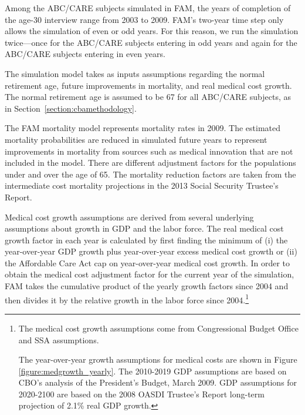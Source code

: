 \noindent Among the ABC/CARE subjects simulated in FAM, the years of completion of the age-30 interview range from 2003 to 2009. FAM's two-year time step only allows the simulation of even or odd years. For this reason, we run the simulation twice---once for the ABC/CARE subjects entering in odd years and again for the ABC/CARE subjects entering in even years.

\noindent The simulation model takes as inputs assumptions regarding the normal retirement age, future improvements in mortality, and real medical cost growth. The normal retirement age is assumed to be 67 for all ABC/CARE subjects, as in Section~\ref{section:cbamethodology}.

\noindent The FAM mortality model represents mortality rates in 2009. The estimated mortality probabilities are reduced in simulated future years to represent improvements in mortality from sources such as medical innovation that are not included in the model. There are different adjustment factors for the populations under and over the age of 65. The mortality reduction factors are taken from the intermediate cost mortality projections in the 2013 Social Security Trustee's Report.

\noindent Medical cost growth assumptions are derived from several underlying assumptions about growth in GDP and the labor force. The real medical cost growth factor in each year is calculated by first finding the minimum of (i) the year-over-year GDP growth plus year-over-year excess medical cost growth or (ii) the Affordable Care Act cap on year-over-year medical cost growth. In order to obtain the medical cost adjustment factor for the current year of the simulation, FAM takes the cumulative product of the yearly growth factors since 2004 and then divides it by the relative growth in the labor force since 2004.\footnote{The medical cost growth assumptions come from Congressional Budget Office and SSA assumptions.

The year-over-year growth assumptions for medical costs are shown in Figure \ref{figure:medgrowth_yearly}.
The 2010-2019 GDP assumptions are based on CBO's analysis of the President's Budget, March 2009.
GDP assumptions for 2020-2100 are based on the 2008 OASDI Trustee's Report long-term projection of 2.1\% real GDP growth.}

